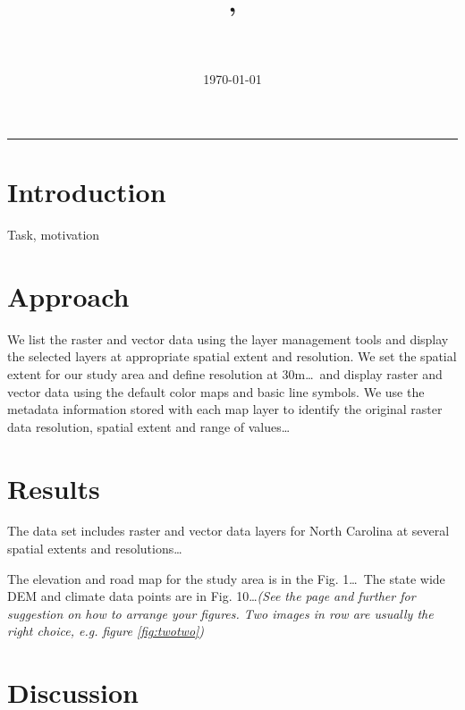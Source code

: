 \documentclass[10pt]{article}
\title{\classId, \classSemestr \\ \className \\ \assignmentTopic}
\author{\authorName}
\date{\today}
\begin{document}
\maketitle
\noindent
\rule{\textwidth}{1.5pt}

\pagestyle{fancy}


\section*{Introduction}

Task, motivation

\section*{Approach}

We list the raster and vector data using the layer management tools and display
the selected layers at appropriate spatial extent and resolution.
We set the spatial extent for our study area and define resolution at 30m\ldots\ and
display raster and vector data using the default color maps and basic line symbols.
We use the metadata information stored with each map layer to identify
the original raster data resolution, spatial extent and range of values\ldots


\section*{Results}

The data set includes raster and vector data layers for North Carolina
at several spatial extents and resolutions\ldots

The elevation and road map for the study area is in the Fig. 1\ldots\ The state wide DEM
and climate data points are in Fig. 10\ldots \emph{(See the page \pageref{fig:figure-internal-label} and further
for suggestion on how to arrange your figures. Two images in row are usually the right choice,
e.g. figure \ref{fig:twotwo})}


\section*{Discussion}
\end{document}
